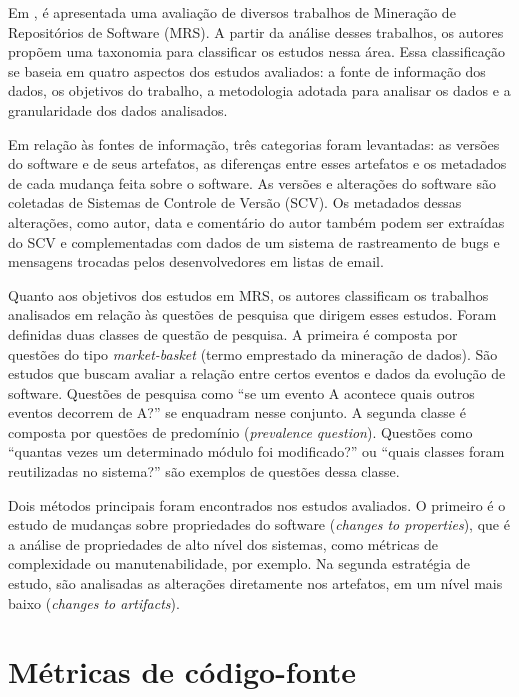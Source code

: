 \documentclass[a4paper, 12pt, twoside]{book}
\begin{document}
        Em \cite{Kagdi:2007}, é apresentada uma avaliação de diversos trabalhos de Mineração
        de Repositórios de Software (MRS). A partir da análise desses trabalhos, os autores propõem
        uma taxonomia para classificar os estudos nessa área. Essa classificação se baseia
        em quatro aspectos dos estudos avaliados: a fonte de informação dos dados, os objetivos
        do trabalho, a metodologia adotada para analisar os dados e a granularidade dos dados
        analisados.

        Em relação às fontes de informação, três categorias foram levantadas: as versões do software 
        e de seus artefatos, as diferenças entre esses artefatos e os metadados de cada mudança
        feita sobre o software. As versões e alterações do software são coletadas de Sistemas
        de Controle de Versão (SCV). Os metadados dessas alterações, como autor, data e comentário do 
        autor também podem ser extraídas do SCV e complementadas com dados de um sistema de 
        rastreamento de bugs e mensagens trocadas pelos desenvolvedores em listas de email.

        Quanto aos objetivos dos estudos em MRS, os autores classificam os trabalhos analisados
        em relação às questões de pesquisa que dirigem esses estudos. Foram definidas duas classes
        de questão de pesquisa. A primeira é composta por questões do tipo \textit{market-basket}
        (termo emprestado da mineração de dados). São estudos que buscam avaliar a relação
        entre certos eventos e dados da evolução de software. Questões de pesquisa como ``se um evento A
        acontece quais outros eventos decorrem de A?'' se enquadram nesse conjunto. A segunda classe
        é composta por questões de predomínio (\textit{prevalence question}). Questões como ``quantas
        vezes um determinado módulo foi modificado?'' ou ``quais classes foram reutilizadas no sistema?''
        são exemplos de questões dessa classe.

        Dois métodos principais foram encontrados nos estudos avaliados. O primeiro é o estudo
        de mudanças sobre propriedades do software (\textit{changes to properties}), que é a 
        análise de propriedades de alto nível dos sistemas, como métricas de complexidade ou
        manutenabilidade, por exemplo. Na segunda estratégia de estudo, são analisadas 
        as alterações diretamente nos artefatos, em um nível mais baixo 
        (\textit{changes to artifacts}).

    \section{Métricas de código-fonte} \label{sc:metricas}
\end{document}
